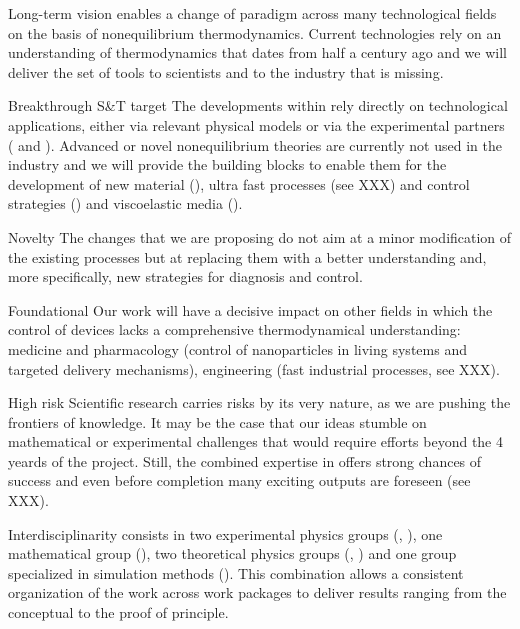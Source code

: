 \begin{compactdesc}
\item[Long-term vision] \TheProject enables a change of paradigm across many technological
fields on the basis of nonequilibrium thermodynamics. Current technologies rely on an
understanding of thermodynamics that dates from half a century ago and we will deliver the
set of tools to scientists and to the industry that is missing.
\item[Breakthrough S\&T target] The developments within \TheProject rely directly on
technological applications, either via relevant physical models or via the experimental
partners ( and ). Advanced or novel nonequilibrium theories are
currently not used in the industry and we will provide the building blocks to enable them
for the development of new material (), ultra fast processes (see XXX)
and control strategies () and viscoelastic media ().
\item[Novelty] The changes that we are proposing do not aim at a minor modification of the
existing processes but at replacing them with a better understanding and, more specifically,
new strategies for diagnosis and control.
\item[Foundational] Our work will have a decisive impact on other fields in which the
control of devices lacks a comprehensive thermodynamical understanding: medicine and
pharmacology (control of nanoparticles in living systems and targeted delivery mechanisms),
engineering (fast industrial processes, see XXX).
\item[High risk] Scientific research carries risks by its very nature, as we are pushing the
frontiers of knowledge. It may be the case that our ideas stumble on mathematical or
experimental challenges that would require efforts beyond the 4 yeards of the
project. Still, the combined expertise in \TheProject offers strong chances of success and
even before completion many exciting outputs are foreseen (see XXX).
\item[Interdisciplinarity] \TheProject consists in two experimental physics groups
(, ), one mathematical group (), two theoretical physics
groups (, ) and one group specialized in simulation methods
(). This combination allows a consistent organization of the work across work
packages to deliver results ranging from the conceptual to the proof of principle.
\end{compactdesc}

